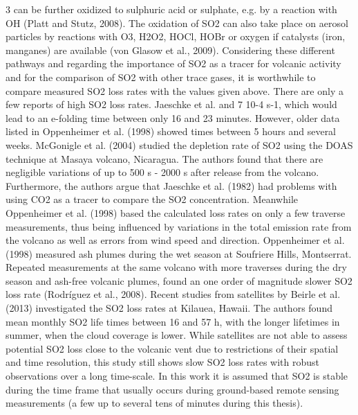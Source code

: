 \documentclass  [
  paper    = a4,
  BCOR     = 10mm,
  twoside,
  fontsize = 12pt,
  fleqn,
  toc      = bibnumbered,
  toc      = listofnumbered,
  numbers  = noendperiod,
  headings = normal,
  listof   = leveldown,
  version  = 3.03
]                                       {scrreprt}
\begin{document}
	3 can be further oxidized to sulphuric acid or sulphate, e.g. by a
	reaction with OH (Platt and Stutz, 2008). The oxidation of SO2 can also take
	place on aerosol particles by reactions with O3, H2O2, HOCl, HOBr or oxygen if
	catalysts (iron, manganes) are available (von Glasow et al., 2009).
	Considering these different pathways and regarding the importance of SO2 as
	a tracer for volcanic activity and for the comparison of SO2 with other trace
	gases, it is worthwhile to compare measured SO2 loss rates with the values given
	above. There are only a few reports of high SO2 loss rates. Jaeschke et al.
	and 7  10-4 s-1, which would lead to an e-folding time between only 16 and
	23 minutes. However, older data listed in Oppenheimer et al. (1998) showed
	times between 5 hours and several weeks. McGonigle et al. (2004) studied the
	depletion rate of SO2 using the DOAS technique at Masaya volcano, Nicaragua.
	The authors found that there are negligible variations of up to 500 s - 2000 s
	after release from the volcano. Furthermore, the authors argue that Jaeschke
	et al. (1982) had problems with using CO2 as a tracer to compare the SO2
	concentration. Meanwhile Oppenheimer et al. (1998) based the calculated loss
	rates on only a few traverse measurements, thus being influenced by variations
	in the total emission rate from the volcano as well as errors from wind speed and
	direction. Oppenheimer et al. (1998) measured ash plumes during the wet season
	at Soufriere Hills, Montserrat. Repeated measurements at the same volcano with
	more traverses during the dry season and ash-free volcanic plumes, found an one
	order of magnitude slower SO2 loss rate (Rodríguez et al., 2008). Recent studies
	from satellites by Beirle et al. (2013) investigated the SO2 loss rates at Kilauea,
	Hawaii. The authors found mean monthly SO2 life times between 16 and 57 h,
	with the longer lifetimes in summer, when the cloud coverage is lower. While
	satellites are not able to assess potential SO2 loss close to the volcanic vent due
	to restrictions of their spatial and time resolution, this study still shows slow
	SO2 loss rates with robust observations over a long time-scale.
	In this work it is assumed that SO2 is stable during the time frame that usually
	occurs during ground-based remote sensing measurements (a few up to several
	tens of minutes during this thesis).
\end{document}
